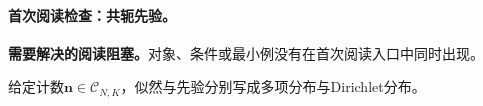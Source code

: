 \documentclass[UTF8,a4paper,11pt,openany]{ctexbook}
\begin{document}
\setcounter{page}{836}
\setcounter{chapter}{34}
\setcounter{section}{4}
\setcounter{figure}{5}
\setcounter{equation}{15}
\pagestyle{headings}

\FloatBarrier

\paragraph{首次阅读检查：共轭先验。}\textbf{需要解决的阅读阻塞。}对象、条件或最小例没有在首次阅读入口中同时出现。

给定计数$\boldsymbol n\in\mathcal C_{N,K}$，似然与先验分别写成多项分布与Dirichlet分布。
\end{document}
